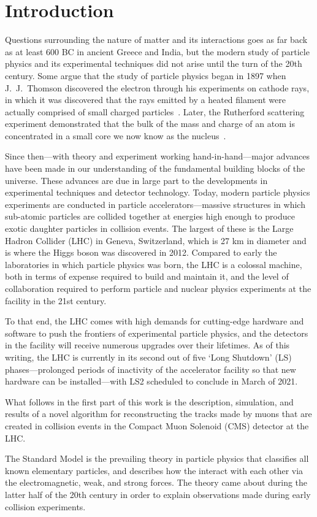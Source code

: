 
\chapter{Introduction}
Questions surrounding the nature of matter and its interactions goes as far back as at least 600 BC in ancient Greece and India, but the modern study of particle physics and its experimental techniques did not arise until the turn of the 20th century.
Some argue that the study of particle physics began in 1897 when J.\ J.\ Thomson discovered the electron through his experiments on cathode rays, in which it was discovered that the rays emitted by a heated filament were actually comprised of small charged particles~\cite{GriffithsParticle}.
Later, the Rutherford scattering experiment demonstrated that the bulk of the mass and charge of an atom is concentrated in a small core we now know as the nucleus~\cite{BargerCollider}.


Since then---with theory and experiment working hand-in-hand---major advances have been made in our understanding of the fundamental building blocks of the universe.
These advances are due in large part to the developments in experimental techniques and detector technology.
Today, modern particle physics experiments are conducted in particle accelerators---massive structures in which sub-atomic particles are collided together at energies high enough to produce exotic daughter particles in collision events.
The largest of these is the Large Hadron Collider (LHC) in Geneva, Switzerland, which is 27 km in diameter and is where the Higgs boson was discovered in 2012.
Compared to early the laboratories in which particle physics was born, the LHC is a colossal machine, both in terms of expense required to build and maintain it, and the level of collaboration required to perform particle and nuclear physics experiments at the facility in the 21st century.

To that end, the LHC comes with high demands for cutting-edge hardware and software to push the frontiers of experimental particle physics, and the detectors in the facility will receive numerous upgrades over their lifetimes.
As of this writing, the LHC is currently in its second out of five `Long Shutdown' (LS) phases---prolonged periods of inactivity of the accelerator facility so that new hardware can be installed---with LS2 scheduled to conclude in March of 2021.

What follows in the first part of this work is the description, simulation, and results of a novel algorithm for reconstructing the tracks made by muons that are created in collision events in the Compact Muon Solenoid (CMS) detector at the LHC.

The Standard Model is the prevailing theory in particle physics that classifies all known elementary particles, and describes how the interact with each other via the electromagnetic, weak, and strong forces.
The theory came about during the latter half of the 20th century in order to explain observations made during early collision experiments.
